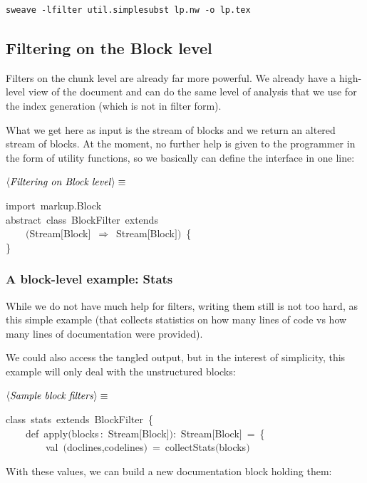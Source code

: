 \documentclass[a4paper,12pt]{article}
\begin{document}
\begin{verbatim}
sweave -lfilter util.simplesubst lp.nw -o lp.tex
\end{verbatim}

\subsection{Filtering on the Block level}
Filters on the chunk level are already far more powerful. We already
have a high-level view of the document and can do the same level of analysis
that we use for the index generation (which is not in filter form).

What we get here as input is the stream of blocks and we return an altered
stream of blocks. At the moment, no further help is given to the programmer
in the form of utility functions, so we basically can define the interface
in one line:

$\left<\mbox{\emph{Filtering on Block level}}\right>\equiv$
\begin{program}{\vem import}~markup.Block
\\{\vem abstract}~{\vem class}~BlockFilter~{\vem extends}
\\~~~~$($Stream$[$Block$]$~$\Rightarrow$~Stream$[$Block$]$$)$~{\small\{}
\\{\small\}}
\\[0.5em]\end{program}
\subsubsection{A block-level example: Stats}
While we do not have much help for filters, writing them still is not
too hard, as this simple example (that collects statistics on how
many lines of code vs how many lines of documentation were provided).

We could also access the tangled output, but in the interest of simplicity,
this example will only deal with the unstructured blocks:

$\left<\mbox{\emph{Sample block filters}}\right>\equiv$
\begin{program}{\vem class}~stats~{\vem extends}~BlockFilter~{\small\{}
\\~~~~{\vem def}~apply$($blocks\,{\rm :}~Stream$[$Block$]$$)${\rm :}~Stream$[$Block$]$~=~{\small\{}
\\~~~~~~~~{\vem val}~$($doclines,codelines$)$~=~collectStats$($blocks$)$
\\[0.5em]\end{program}
With these values, we can build a new documentation block
holding them:
\end{document}
